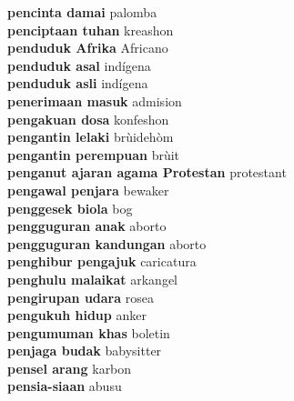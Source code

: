 \textbf{ pencinta damai  } palomba \\
\textbf{ penciptaan tuhan  } kreashon \\
\textbf{ penduduk Afrika  } Africano \\
\textbf{ penduduk asal  } indígena \\
\textbf{ penduduk asli  } indígena \\
\textbf{ penerimaan masuk  } admision \\
\textbf{ pengakuan dosa  } konfeshon \\
\textbf{ pengantin lelaki  } brùidehòm \\
\textbf{ pengantin perempuan  } brùit \\
\textbf{ penganut ajaran agama Protestan  } protestant \\
\textbf{ pengawal penjara  } bewaker \\
\textbf{ penggesek biola  } bog \\
\textbf{ pengguguran anak  } aborto \\
\textbf{ pengguguran kandungan  } aborto \\
\textbf{ penghibur pengajuk  } caricatura \\
\textbf{ penghulu malaikat  } arkangel \\
\textbf{ pengirupan udara  } rosea \\
\textbf{ pengukuh hidup  } anker \\
\textbf{ pengumuman khas  } boletin \\
\textbf{ penjaga budak  } babysitter \\
\textbf{ pensel arang  } karbon \\
\textbf{ pensia-siaan  } abusu \\
